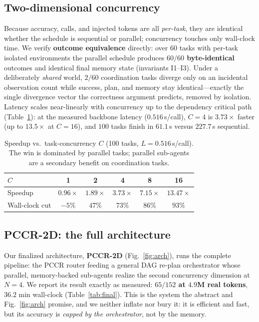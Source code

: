 \documentclass[10pt,twocolumn]{article}
\begin{document}
\subsection{Two-dimensional concurrency}\label{sec:parallel}
Because accuracy, calls, and injected tokens are all \emph{per-task}, they are identical whether the
schedule is sequential or parallel; concurrency touches only wall-clock time. We verify
\textbf{outcome equivalence} directly: over 60 tasks with per-task isolated environments the parallel
schedule produces \textbf{$60/60$ byte-identical} outcomes and identical final memory state
(invariants I1--I3). Under a deliberately \emph{shared} world, $2/60$ coordination tasks diverge only
on an incidental observation count while success, plan, and memory stay identical---exactly the single
divergence vector the correctness argument predicts, removed by isolation. Latency scales near-linearly
with concurrency up to the dependency critical path (Table~\ref{tab:scale}): at the measured backbone
latency ($0.516$\,s/call), $C{=}4$ is \textbf{$3.73\times$} faster (up to $13.5\times$ at $C{=}16$),
and $100$ tasks finish in $61.1$\,s versus $227.7$\,s sequential.

\begin{table}[t]
\centering\small
\setlength{\tabcolsep}{4.5pt}
\begin{tabular}{@{}lccccc@{}}
\toprule
$C$ & 1 & 2 & 4 & 8 & 16\\
\midrule
Speedup        & $0.96\times$ & $1.89\times$ & $\mathbf{3.73\times}$ & $7.15\times$ & $13.47\times$\\
Wall-clock cut & $-5\%$ & $47\%$ & $73\%$ & $86\%$ & $93\%$\\
\bottomrule
\end{tabular}
\caption{Speedup vs.\ task-concurrency $C$ (100 tasks, $L{=}0.516$\,s/call). The win is dominated by
parallel tasks; parallel sub-agents are a secondary benefit on coordination tasks.}
\label{tab:scale}
\end{table}

\subsection{PCCR-2D: the full architecture}\label{sec:twod}
Our finalized architecture, \textbf{PCCR-2D} (Fig.~\ref{fig:arch}), runs the complete pipeline: the
PCCR router feeding a general DAG re-plan orchestrator whose parallel, memory-backed sub-agents realize
the second concurrency dimension at $N{=}4$. We report its result exactly as measured:
\textbf{$65/152$ at $4.9$M real tokens}, $36.2$ min wall-clock (Table~\ref{tab:final}). This is the
system the abstract and Fig.~\ref{fig:arch} promise, and we neither inflate nor bury it: it is
efficient and fast, but its accuracy is \emph{capped by the orchestrator}, not by the memory.
\end{document}
